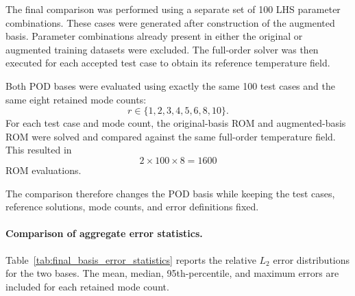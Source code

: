 The final comparison was performed using a separate
set of 100 LHS parameter combinations. These cases
were generated after construction of the augmented
basis. Parameter combinations already present in
either the original or augmented training datasets
were excluded. The full-order solver was then executed
for each accepted test case to obtain its reference
temperature field.

Both POD bases were evaluated using exactly the same
100 test cases and the same eight retained mode counts:
\[
r\in\{1,2,3,4,5,6,8,10\}.
\]
For each test case and mode count, the original-basis
ROM and augmented-basis ROM were solved and compared
against the same full-order temperature field. This
resulted in
\[
2\times100\times8=1600
\]
ROM evaluations.

The comparison therefore changes the POD basis while
keeping the test cases, reference solutions, mode
counts, and error definitions fixed.

\paragraph{Comparison of aggregate error statistics.}

Table~\ref{tab:final_basis_error_statistics} reports
the relative $L_2$ error distributions for the two
bases. The mean, median, 95th-percentile, and maximum
errors are included for each retained mode count.


